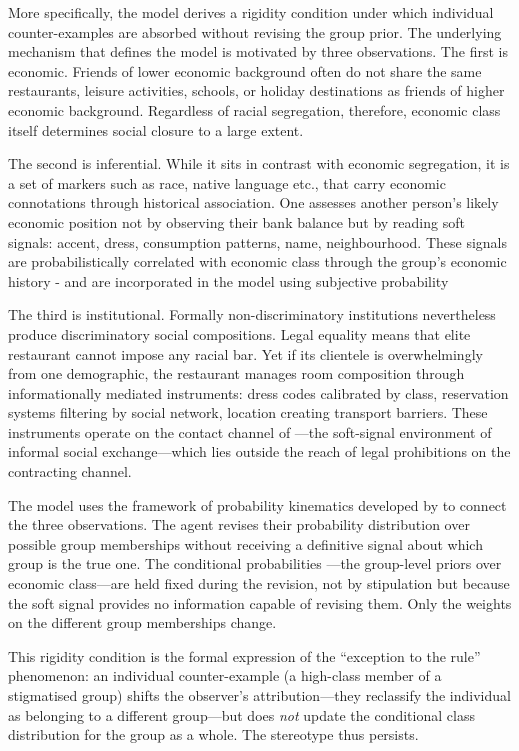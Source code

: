 \documentclass[12pt,a4paper]{article}
\theoremstyle{definition}
\numberwithin{proposition}{subsection}
\begin{document}
More specifically, the model derives a rigidity condition under which individual counter-examples are absorbed without revising the group prior. The underlying mechanism that defines the model is motivated by three observations. The first is economic. Friends of lower economic background often do not
share the same restaurants, leisure activities, schools, or holiday
destinations as friends of higher economic background. Regardless of racial segregation, therefore, economic class itself determines social closure to a
large extent. 

The second is inferential. While it sits in contrast with economic segregation, it is a set of markers such as race, native language etc.,  that carry economic connotations through
historical association. One assesses another person's likely economic
position not by observing their bank balance but by reading soft
signals: accent, dress, consumption patterns, name, neighbourhood.
These signals are probabilistically correlated with economic class
through the group's economic history - and are incorporated in the model using subjective
probability 

The third is institutional. Formally non-discriminatory institutions
nevertheless produce discriminatory social compositions. Legal equality means that elite
restaurant cannot impose any racial bar. Yet if its clientele is
overwhelmingly from one demographic, the restaurant manages room
composition through informationally mediated instruments: dress
codes calibrated by class, reservation systems filtering by social
network, location creating transport barriers. These instruments
operate on the contact channel of \citet{Loury2002}---the soft-signal
environment of informal social exchange---which lies outside the
reach of legal prohibitions on the contracting channel. 

The model uses the framework of probability
kinematics developed by \citet{Jeffrey1965} to connect the three
observations. The agent revises their probability distribution over
possible group memberships without receiving a definitive signal
about which group is the true one. The conditional probabilities
---the group-level priors over economic class---are held fixed
during the revision, not by stipulation but because the soft signal
provides no information capable of revising them. Only the weights
on the different group memberships change.

This rigidity condition is the formal expression of the
``exception to the rule'' phenomenon: an individual counter-example
(a high-class member of a stigmatised group) shifts the observer's
attribution---they reclassify the individual as belonging to a
different group---but does \emph{not} update the conditional class
distribution for the group as a whole. The stereotype thus persists. 
\end{document}
